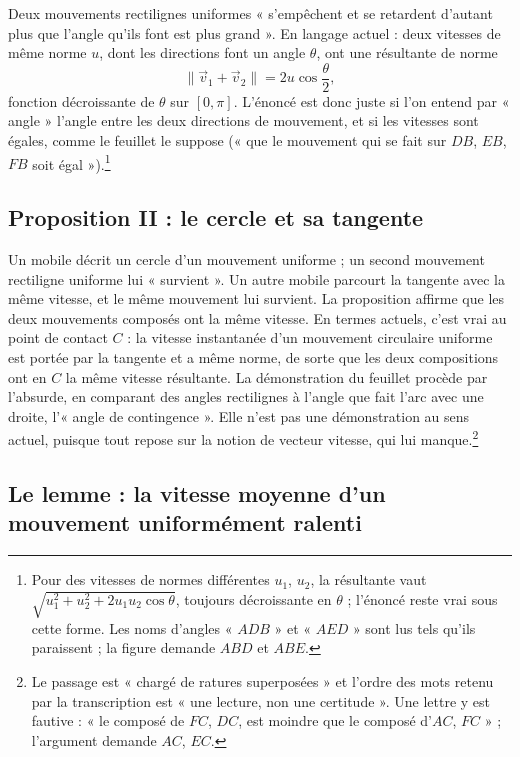 \documentclass[11pt,a4paper]{article}
\begin{document}
Deux mouvements rectilignes uniformes « s'empêchent et se retardent d'autant
plus que l'angle qu'ils font est plus grand ». En langage actuel : deux vitesses
de même norme \(u\), dont les directions font un angle \(\theta\), ont une
résultante de norme
\[
\lVert \vec v_1+\vec v_2\rVert = 2u\cos\frac{\theta}{2},
\]
fonction décroissante de \(\theta\) sur \([0,\pi]\). L'énoncé est donc juste si
l'on entend par « angle » l'angle entre les deux directions de mouvement, et si
les vitesses sont égales, comme le feuillet le suppose (« que le mouvement qui
se fait sur \(DB\), \(EB\), \(FB\) soit égal »).\footnote{Pour des vitesses de
normes différentes \(u_1\), \(u_2\), la résultante vaut
\(\sqrt{u_1^2+u_2^2+2u_1u_2\cos\theta}\), toujours décroissante en
\(\theta\) ; l'énoncé reste vrai sous cette forme. Les noms d'angles « \(ADB\) »
et « \(AED\) » sont lus tels qu'ils paraissent ; la figure demande \(ABD\) et
\(ABE\).}

\subsection*{Proposition II : le cercle et sa tangente}

Un mobile décrit un cercle d'un mouvement uniforme ; un second mouvement
rectiligne uniforme lui « survient ». Un autre mobile parcourt la tangente avec
la même vitesse, et le même mouvement lui survient. La proposition affirme que
les deux mouvements composés ont la même vitesse. En termes actuels, c'est
vrai au point de contact \(C\) : la vitesse instantanée d'un mouvement circulaire
uniforme est portée par la tangente et a même norme, de sorte que les deux
compositions ont en \(C\) la même vitesse résultante. La démonstration du
feuillet procède par l'absurde, en comparant des angles rectilignes à l'angle
que fait l'arc avec une droite, l'« angle de contingence ». Elle n'est pas une
démonstration au sens actuel, puisque tout repose sur la notion de vecteur
vitesse, qui lui manque.\footnote{Le passage est « chargé de ratures
superposées » et l'ordre des mots retenu par la transcription est « une
lecture, non une certitude ». Une lettre y est fautive : « le composé de
\(FC\), \(DC\), est moindre que le composé d'\(AC\), \(FC\) » ; l'argument
demande \(AC\), \(EC\).}

\subsection*{Le lemme : la vitesse moyenne d'un mouvement uniformément ralenti}
\end{document}
